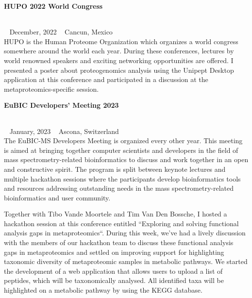 \begin{large}\textbf{\textsf{HUPO 2022 World Congress}}\end{large} \\
\faCalendar ~ \textsf{December, 2022} \hfill \faGlobe ~ \textsf{Cancun, Mexico} \\
HUPO is the Human Proteome Organization which organizes a world congress somewhere around the world each year.
During these conferences, lectures by world renowned speakers and exciting networking opportunities are offered.
I presented a poster about proteogenomics analysis using the Unipept Desktop application at this conference and participated in a discussion at the metaproteomics-specific session.

\pagebreak

\begin{large}\textbf{\textsf{EuBIC Developers' Meeting 2023}}\end{large} \\
\faCalendar ~ \textsf{January, 2023} \hfill \faGlobe ~ \textsf{Ascona, Switzerland} \\
The EuBIC-MS Developers Meeting is organized every other year.
This meeting is aimed at bringing together computer scientists and developers in the field of mass spectrometry-related bioinformatics to discuss and work together in an open and constructive spirit.
The program is split between keynote lectures and multiple hackathon sessions where the participants develop bioinformatics tools and resources addressing outstanding needs in the mass spectrometry-related bioinformatics and user community.

Together with Tibo Vande Moortele and Tim Van Den Bossche, I hosted a hackathon session at this conference entitled ``Exploring and solving functional analysis gaps in metaproteomics``.
During this week, we've had a lively discussion with the members of our hackathon team to discuss these functional analysis gaps in metaproteomics and settled on improving support for highlighting taxonomic diversity of metaproteomic samples in metabolic pathways.
We started the development of a web application that allows users to upload a list of peptides, which will be taxonomically analysed.
All identified taxa will be highlighted on a metabolic pathway by using the KEGG database.

\newpage
